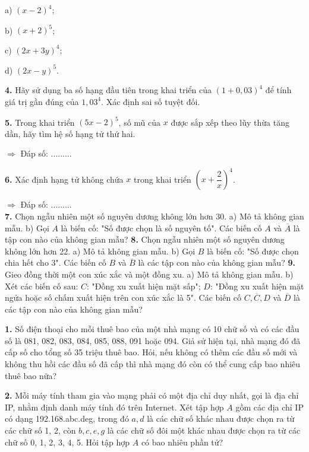 \documentclass[12pt,a4paper]{extarticle}
\begin{document}
a) $(x - 2)^4$;

b) $(x + 2)^5$;

c) $(2x + 3y)^4$;

d) $(2x - y)^5$.

\textbf{{4.}} Hãy sử dụng ba số hạng đầu tiên trong khai triển của $(1 + 0,03)^4$ để tính giá trị gần đúng của $1,03^4$. Xác định sai số tuyệt đối.

\textbf{{5.}} Trong khai triển $(5x - 2)^5$, số mũ của $x$ được sắp xếp theo lũy thừa tăng dần, hãy tìm hệ số hạng tử thứ hai.

$\Rightarrow$ Đáp số: .........

\textbf{{6.}} Xác định hạng tử không chứa $x$ trong khai triển $\left(x + \dfrac{2}{x}\right)^4$.

$\Rightarrow$ Đáp số: .........\\
\vspace{0.5cm}
\noindent\textbf{7.} Chọn ngẫu nhiên một số nguyên dương không lớn hơn 30.
\noindent a) Mô tả không gian mẫu.
\noindent b) Gọi $A$ là biến cố: "Số được chọn là số nguyên tố". Các biến cố $A$ và $\overline{A}$ là tập con nào của không gian mẫu?
\vspace{0.4cm}
\noindent\textbf{8.} Chọn ngẫu nhiên một số nguyên dương không lớn hơn 22.
\noindent a) Mô tả không gian mẫu.
\noindent b) Gọi $B$ là biến cố: "Số được chọn chia hết cho 3". Các biến cố $B$ và $\overline{B}$ là các tập con nào của không gian mẫu?
\vspace{0.4cm}
\noindent\textbf{9.} Gieo đồng thời một con xúc xắc và một đồng xu.
\noindent a) Mô tả không gian mẫu.
\noindent b) Xét các biến cố sau:
\noindent $C$: "Đồng xu xuất hiện mặt sấp";
\noindent $D$: "Đồng xu xuất hiện mặt ngửa hoặc số chấm xuất hiện trên con xúc xắc là 5".
\noindent Các biến cố $C, \overline{C}, D$ và $\overline{D}$ là các tập con nào của không gian mẫu?

\noindent\textbf{1.} Số điện thoại cho mỗi thuê bao của một nhà mạng có 10 chữ số và có các đầu số là 081, 082, 083, 084, 085, 088, 091 hoặc 094. Giả sử hiện tại, nhà mạng đó đã cấp số cho tổng số 35 triệu thuê bao. Hỏi, nếu không có thêm các đầu số mới và không thu hồi các đầu số đã cấp thì nhà mạng đó còn có thể cung cấp bao nhiêu thuê bao nữa?

\vspace{0.4cm}
\noindent\textbf{2.} Mỗi máy tính tham gia vào mạng phải có một địa chỉ duy nhất, gọi là địa chỉ IP, nhằm định danh máy tính đó trên Internet. Xét tập hợp $A$ gồm các địa chỉ IP có dạng 192.168.abc.deg, trong đó $a, d$ là các chữ số khác nhau được chọn ra từ các chữ số 1, 2, còn $b, c, e, g$ là các chữ số đôi một khác nhau được chọn ra từ các chữ số 0, 1, 2, 3, 4, 5. Hỏi tập hợp $A$ có bao nhiêu phần tử?
\end{document}
